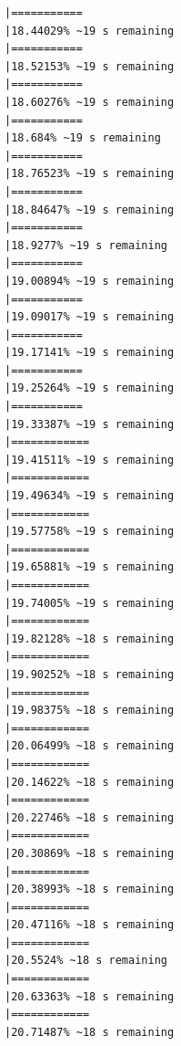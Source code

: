 \documentclass{article}\usepackage[]{graphicx}\usepackage[]{xcolor}
\makeatletter
\newenvironment{kframe}{%
 \def\at@end@of@kframe{}%
 \ifinner\ifhmode%
  \def\at@end@of@kframe{\end{minipage}}%
  \begin{minipage}{\columnwidth}%
 \fi\fi%
 \def\FrameCommand##1{\hskip\@totalleftmargin \hskip-\fboxsep
 \colorbox{shadecolor}{##1}\hskip-\fboxsep
     \hskip-\linewidth \hskip-\@totalleftmargin \hskip\columnwidth}%
 \MakeFramed {\advance\hsize-\width
   \@totalleftmargin\z@ \linewidth\hsize
   \@setminipage}}%
 {\par\unskip\endMakeFramed%
 \at@end@of@kframe}
\newenvironment{knitrout}{}{} %
\makeatother
\begin{document}
\begin{knitrout}
\begin{kframe}
\begin{verbatim}
|===========                                                   |18.44029% ~19 s remaining 
|===========                                                   |18.52153% ~19 s remaining 
|===========                                                   |18.60276% ~19 s remaining 
|===========                                                   |18.684% ~19 s remaining   
|===========                                                   |18.76523% ~19 s remaining 
|===========                                                   |18.84647% ~19 s remaining 
|===========                                                   |18.9277% ~19 s remaining  
|===========                                                   |19.00894% ~19 s remaining 
|===========                                                   |19.09017% ~19 s remaining 
|===========                                                   |19.17141% ~19 s remaining 
|===========                                                   |19.25264% ~19 s remaining 
|===========                                                   |19.33387% ~19 s remaining 
|============                                                  |19.41511% ~19 s remaining 
|============                                                  |19.49634% ~19 s remaining 
|============                                                  |19.57758% ~19 s remaining 
|============                                                  |19.65881% ~19 s remaining 
|============                                                  |19.74005% ~19 s remaining 
|============                                                  |19.82128% ~18 s remaining 
|============                                                  |19.90252% ~18 s remaining 
|============                                                  |19.98375% ~18 s remaining 
|============                                                  |20.06499% ~18 s remaining 
|============                                                  |20.14622% ~18 s remaining 
|============                                                  |20.22746% ~18 s remaining 
|============                                                  |20.30869% ~18 s remaining 
|============                                                  |20.38993% ~18 s remaining 
|============                                                  |20.47116% ~18 s remaining 
|============                                                  |20.5524% ~18 s remaining  
|============                                                  |20.63363% ~18 s remaining 
|============                                                  |20.71487% ~18 s remaining 

\end{verbatim}
\end{kframe}
\end{knitrout}
\end{document}
